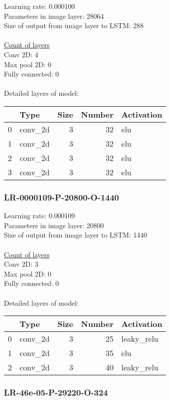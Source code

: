 Learning rate: 0.000100
\\Parameters in image layer: 28064
\\Size of output from image layer to LSTM: 288
\\\\\underline{Count of layers} 
\\Conv 2D:           4\\Max pool 2D:      0\\Fully connected:  0
\\\\Detailed layers of model: \\\begin{tabular}{rlrrl}
\hline
    & Type    &   Size &   Number & Activation   \\
\hline
  0 & conv\_2d &      3 &       32 & elu          \\
  1 & conv\_2d &      3 &       32 & elu          \\
  2 & conv\_2d &      3 &       32 & elu          \\
  3 & conv\_2d &      3 &       32 & elu          \\
\hline
\end{tabular}\subsubsection*{LR-0000109-P-20800-O-1440}
Learning rate: 0.000109
\\Parameters in image layer: 20800
\\Size of output from image layer to LSTM: 1440
\\\\\underline{Count of layers} 
\\Conv 2D:           3\\Max pool 2D:      0\\Fully connected:  0
\\\\Detailed layers of model: \\\begin{tabular}{rlrrl}
\hline
    & Type    &   Size &   Number & Activation   \\
\hline
  0 & conv\_2d &      3 &       25 & leaky\_relu   \\
  1 & conv\_2d &      3 &       35 & elu          \\
  2 & conv\_2d &      3 &       40 & leaky\_relu   \\
\hline
\end{tabular}\subsubsection*{LR-46e-05-P-29220-O-324}
